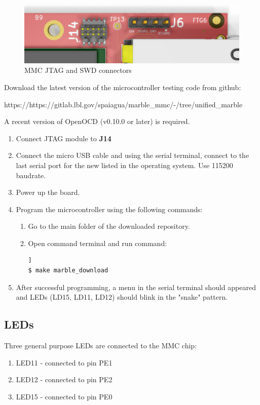\documentclass[12pt,oneside,a4]{article}
\begin{document}
\begin{figure}[H]
\begin{center}
\includegraphics[width=1\linewidth]{mmcjtagswd.png}
 \caption{MMC JTAG and SWD connectors}\label{mmcjtagswd}
\end{center}
\end{figure}

Download the latest version of the microcontroller testing code from github:
\begin{leftbar}
https://https://gitlab.lbl.gov/spaiagua/marble\_mmc/-/tree/unified\_marble
\end{leftbar}

A recent version of OpenOCD (v0.10.0 or later) is required.
\begin{enumerate}
	\item Connect JTAG module to \textbf{J14}
	\item Connect the micro USB cable and using the serial terminal, connect to the last serial port for the new listed in the operating system. Use 115200 baudrate.
	\item Power up the board.
	\item Program the microcontroller using the following commands:
	\begin{enumerate}
	\item Go to the main folder of the downloaded repository.
	\item Open command terminal and run command:
	\begin{lstlisting}[backgroundcolor = \color{Gainsboro}, language=bash, frame=none]]
$ make marble_download
	\end{lstlisting}
	\end{enumerate}
	\item After successful programming, a menu in the serial terminal should appeared and LEDs (LD15, LD11, LD12) should blink in the "snake" pattern.
\end{enumerate}
\subsection{LEDs}
Three general purpose LEDs are connected to the MMC chip:
\begin{enumerate}
	\item LED11 - connected to pin PE1
	\item LED12 - connected to pin PE2
	\item LED15 - connected to pin PE0
\end{enumerate}
\end{document}
